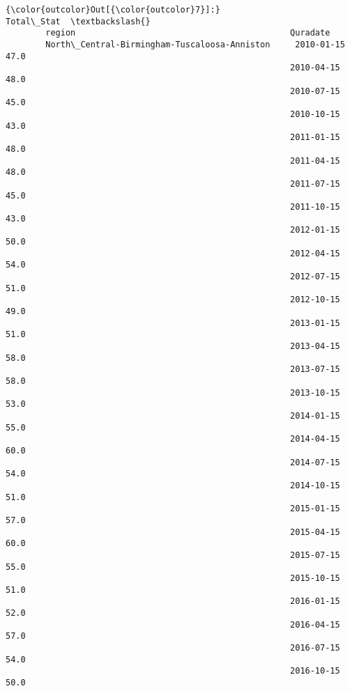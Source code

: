 \documentclass[11pt]{article}
\begin{document}
\begin{Verbatim}[commandchars=\\\{\}]
{\color{outcolor}Out[{\color{outcolor}7}]:}                                                              Total\_Stat  \textbackslash{}
        region                                           Quradate                 
        North\_Central-Birmingham-Tuscaloosa-Anniston     2010-01-15        47.0   
                                                         2010-04-15        48.0   
                                                         2010-07-15        45.0   
                                                         2010-10-15        43.0   
                                                         2011-01-15        48.0   
                                                         2011-04-15        48.0   
                                                         2011-07-15        45.0   
                                                         2011-10-15        43.0   
                                                         2012-01-15        50.0   
                                                         2012-04-15        54.0   
                                                         2012-07-15        51.0   
                                                         2012-10-15        49.0   
                                                         2013-01-15        51.0   
                                                         2013-04-15        58.0   
                                                         2013-07-15        58.0   
                                                         2013-10-15        53.0   
                                                         2014-01-15        55.0   
                                                         2014-04-15        60.0   
                                                         2014-07-15        54.0   
                                                         2014-10-15        51.0   
                                                         2015-01-15        57.0   
                                                         2015-04-15        60.0   
                                                         2015-07-15        55.0   
                                                         2015-10-15        51.0   
                                                         2016-01-15        52.0   
                                                         2016-04-15        57.0   
                                                         2016-07-15        54.0   
                                                         2016-10-15        50.0   

\end{Verbatim}
\end{document}

